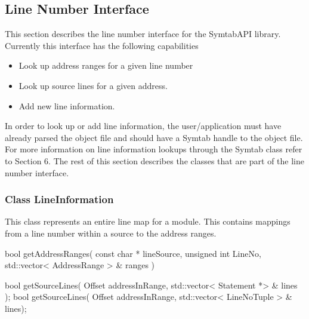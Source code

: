 \subsection{Line Number Interface}

This section describes the line number interface for the SymtabAPI library. Currently this interface has the following capabilities
\begin{itemize}
    \item Look up address ranges for a given line number
    \item Look up source lines for a given address.
    \item Add new line information.
\end{itemize}

In order to look up or add line information, the user/application must have already parsed the object file and should have a Symtab handle to the object file. For more information on line information lookups through the Symtab class refer to Section 6. The rest of this section describes the classes that are part of the line number interface.

\subsubsection{Class LineInformation}
This class represents an entire line map for a module. This contains mappings from a line number within a source to the address ranges.

\begin{apient}
bool getAddressRanges( const char * lineSource, unsigned int LineNo, std::vector< AddressRange > & ranges )
\end{apient}

\begin{apient}
bool getSourceLines( Offset addressInRange, std::vector< Statement *> & lines );
bool getSourceLines( Offset addressInRange, std::vector< LineNoTuple > & lines);

\end{apient}

